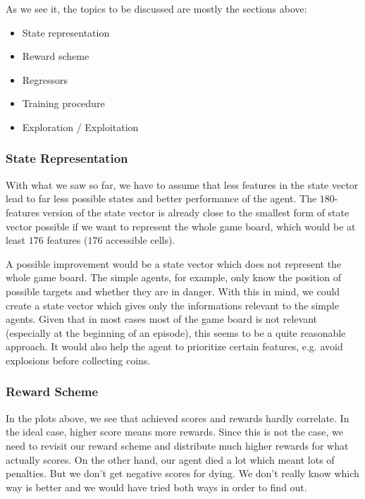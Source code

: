 
As we see it, the topics to be discussed are mostly the sections above:
\begin{itemize}
	\item State representation
	\item Reward scheme
	\item Regressors
	\item Training procedure
	\item Exploration / Exploitation
\end{itemize}

\subsubsection{State Representation}
With what we saw so far, we have to assume that less features in the state vector lead to far less possible states and better performance of the agent. The $180$-features version of the state vector is already close to the smallest form of state vector possible if we want to represent the whole game board, which would be at least $176$ features ($176$ accessible cells). \par
A possible improvement would be a state vector which does not represent the whole game board. The simple agents, for example, only know the position of possible targets and whether they are in danger. With this in mind, we could create a state vector which gives only the informations relevant to the simple agents. Given that in most cases most of the game board is not relevant (especially at the beginning of an episode), this seems to be a quite reasonable approach. It would also help the agent to prioritize certain features, e.g. avoid explosions before collecting coins.

\subsubsection{Reward Scheme}
In the plots above, we see that achieved scores and rewards hardly correlate. In the ideal case, higher score means more rewards. Since this is not the case, we need to revisit our reward scheme and distribute much higher rewards for what actually scores. On the other hand, our agent died a lot which meant lots of penalties. But we don't get negative scores for dying. We don't really know which way is better and we would have tried both ways in order to find out.

